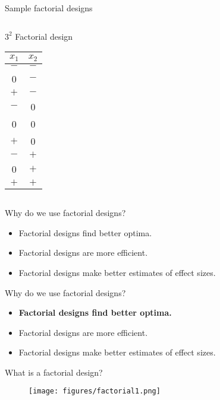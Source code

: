 \documentclass[10pt]{beamer}
\newcommand\lo{\ensuremath{\boldsymbol{-}}}
\newcommand\hi{\ensuremath{\boldsymbol{+}}}
\begin{document}
\begin{frame}{Sample factorial designs}
\begin{columns}
\begin{column}{0.3\textwidth}
\begin{center}
$3^2$ Factorial design\\
\begin{tabular}{cc}
$x_1$ & $x_2$ \\
\hline
\lo & \lo \\
0 & \lo \\
\hi & \lo \\
\lo & 0 \\
0 & 0 \\
\hi & 0 \\
\lo & \hi \\
0 & \hi \\
\hi & \hi \\
\end{tabular}
\end{center}
\end{column}

\end{columns}
	
\end{frame}


\begin{frame}{Why do we use factorial designs?}

\begin{itemize}
\item Factorial designs find better optima.
\item Factorial designs are more efficient.
\item Factorial designs make better estimates of effect sizes.
\end{itemize}

\end{frame}

\begin{frame}{Why do we use factorial designs?}

\begin{itemize}
\item
  \textbf{Factorial designs find better optima.}
\item
  Factorial designs are more efficient.
\item
  Factorial designs make better estimates of effect sizes.
\end{itemize}

\end{frame}

\begin{frame}{What is a factorial design?}

\begin{figure}
\centering
\texttt{[image: figures/factorial1.png]}
\end{figure}

\end{frame}
\end{document}
